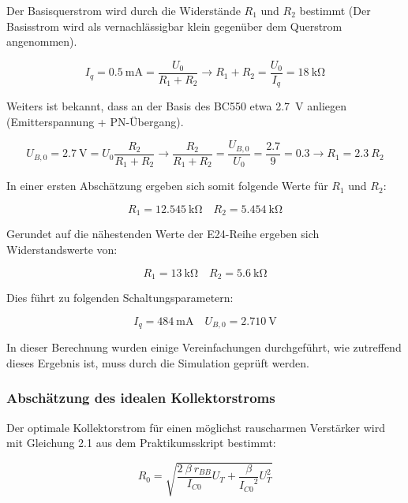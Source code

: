 Der Basisquerstrom wird durch die Widerstände $R_1$ und $R_2$ bestimmt (Der Basisstrom wird als vernachlässigbar klein gegenüber dem Querstrom angenommen).

\begin{equation*}
    I_q = \SI{0.5}{\milli \ampere} = \frac{U_0}{R_1 + R_2} \rightarrow R_1 + R_2 = \frac{U_0}{I_q} = \SI{18}{\kilo \ohm}
\end{equation*}

Weiters ist bekannt, dass an der Basis des BC550 etwa \SI{2.7}{\volt} anliegen (Emitterspannung + PN-Übergang). 

\begin{equation*}
    U_{B,0} = \SI{2.7}{\volt} = U_0 \frac{R_2}{R_1+R_2} \rightarrow \frac{R_2}{R_1+R_2} = \frac{U_{B,0}}{U_0} = \frac{2.7}{9} = 0.3
    \rightarrow R_1 = 2.3 \ R_2
\end{equation*}

In einer ersten Abschätzung ergeben sich somit folgende Werte für $R_1$ und $R_2$:

\begin{equation*}
    R_1 = \SI{12.545}{\kilo \ohm} \quad R_2 = \SI{5.454}{\kilo \ohm}
\end{equation*}

Gerundet auf die nähestenden Werte der E24-Reihe ergeben sich Widerstandswerte von:

\begin{equation*}
    R_1 = \SI{13}{\kilo \ohm} \quad R_2 = \SI{5.6}{\kilo \ohm}
\end{equation*}

Dies führt zu folgenden Schaltungsparametern:

\begin{equation*}
    I_q = \SI{484}{\milli \ampere} \quad U_{B,0} = \SI{2.710}{\volt}
\end{equation*}

In dieser Berechnung wurden einige Vereinfachungen durchgeführt, wie zutreffend dieses Ergebnis ist, muss durch die Simulation geprüft werden.

\subsubsection{Abschätzung des idealen Kollektorstroms}

Der optimale Kollektorstrom für einen möglichst rauscharmen Verstärker wird mit Gleichung 2.1 aus dem Praktikumsskript bestimmt:

\begin{equation*}
    R_0 = \sqrt{\frac{2 \ \beta \  r_{BB}}{I_{C0}}U_T + \frac{\beta}{ {I_{C0}}^2 }U_{T}^2}
\end{equation*}

